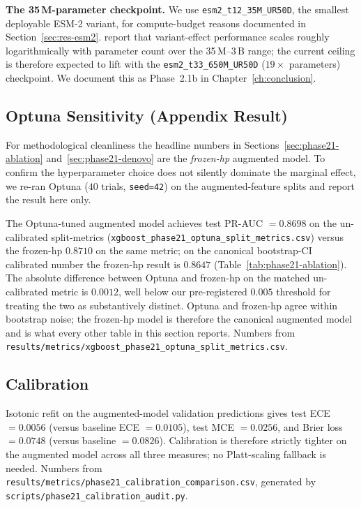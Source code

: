 \documentclass[11pt,a4paper,oneside]{report}
\begin{document}
\textbf{The 35\,M-parameter checkpoint.} We use
\texttt{esm2\_t12\_35M\_UR50D}, the smallest deployable
\textsc{ESM-2} variant, for compute-budget reasons documented in
Section~\ref{sec:res-esm2}. \citet{lin2023esm2} report that
variant-effect performance scales roughly logarithmically with
parameter count over the 35\,M--3\,B range; the current ceiling
is therefore expected to lift with the
\texttt{esm2\_t33\_650M\_UR50D} ($19\times$ parameters)
checkpoint. We document this as Phase~2.1b in
Chapter~\ref{ch:conclusion}.

\subsection{Optuna Sensitivity (Appendix Result)}
\label{sec:phase21-optuna}

For methodological cleanliness the headline numbers in
Sections~\ref{sec:phase21-ablation} and~\ref{sec:phase21-denovo}
are the \emph{frozen-hp} augmented model. To confirm the
hyperparameter choice does not silently dominate the marginal
effect, we re-ran Optuna ($40$ trials, \texttt{seed=42}) on the
augmented-feature splits and report the result here only.

The Optuna-tuned augmented model achieves test PR-AUC
$=0.8698$ on the un-calibrated split-metrics
(\texttt{xgboost\_phase21\_optuna\_split\_metrics.csv})
versus the frozen-hp $0.8710$ on the same metric; on the
canonical bootstrap-CI calibrated number the frozen-hp result
is $0.8647$ (Table~\ref{tab:phase21-ablation}). The absolute
difference between Optuna and frozen-hp on the matched
un-calibrated metric is $0.0012$, well below our
pre-registered $0.005$ threshold for treating the two as
substantively distinct. Optuna and frozen-hp agree
within bootstrap noise; the frozen-hp model is therefore the
canonical augmented model and is what every other table in
this section reports. Numbers from
\texttt{results/metrics/xgboost\_phase21\_optuna\_split\_metrics.csv}.

\subsection{Calibration}
\label{sec:phase21-calibration}

Isotonic refit on the augmented-model validation predictions gives
test ECE $=0.0056$ (versus baseline ECE $=0.0105$), test MCE
$=0.0256$, and Brier loss $=0.0748$ (versus baseline $=0.0826$).
Calibration is therefore strictly tighter on the augmented model across
all three measures; no Platt-scaling fallback is needed.
Numbers from
\texttt{results/metrics/phase21\_calibration\_comparison.csv},
generated by \texttt{scripts/phase21\_calibration\_audit.py}.
\end{document}
